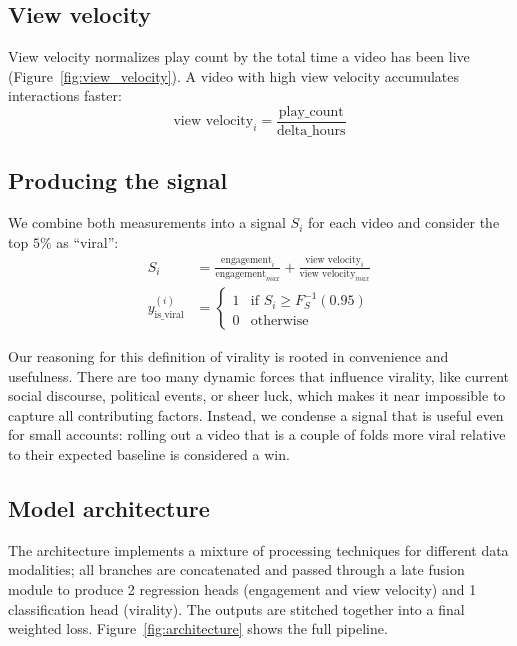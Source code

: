 \documentclass{article}
\begin{document}
\subsection*{View velocity}
View velocity normalizes play count by the total time a video has been live
(Figure~\ref{fig:view_velocity}). A video with high view velocity accumulates interactions faster:
\vspace{-6pt}
\begin{equation}
\text{view velocity}_i = \frac{\text{play\_count}}{\text{delta\_hours}}
\label{eq:velocity}
\end{equation}

\subsection*{Producing the signal}
We combine both measurements into a signal $S_i$ for each video and consider the
top $5\%$ as ``viral'':
\begin{align}
S_i &= \frac{\text{engagement}_i}{\text{engagement}_{max}} + \frac{\text{view velocity}_i}{\text{view velocity}_{max}} \label{eq:signal} \\
y_{\text{is\_viral}}^{(i)} &=
\begin{cases}
  1 & \text{if } S_i \geq F_S^{-1}(0.95) \\
  0 & \text{otherwise}
\end{cases} \label{eq:viral}
\end{align}

Our reasoning for this definition of virality is rooted in convenience and
usefulness. There are too many dynamic forces that influence virality, like current social
discourse, political events, or sheer luck, which makes it near impossible to
capture all contributing factors. Instead, we condense a signal that is useful
even for small accounts: rolling out a video that is a couple of folds more viral
relative to their expected baseline is considered a win.

\subsection{Model architecture}
\label{sec:architecture}

The architecture implements a mixture of processing techniques for different data
modalities; all branches are concatenated and passed through a late fusion module
to produce 2 regression heads (engagement and view velocity) and 1
classification head (virality). The outputs are stitched together into a final
weighted loss. Figure~\ref{fig:architecture} shows the full pipeline.
\end{document}
